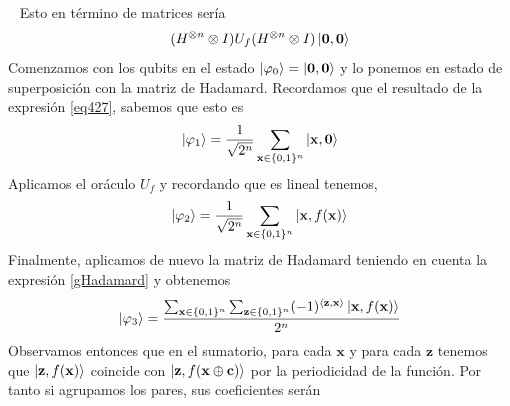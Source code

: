 \documentclass[a4paper]{article}
\numberwithin{equation}{section}
\begin{document}
\begin{figure}[h]
\centering
{}
\end{figure}\ \linebreak
Esto en término de matrices sería
\begin{equation}
(H^{\otimes n}\otimes I) U_f (H^{\otimes n}\otimes I)\ket{\mathbf{0}, \mathbf{0}}
\end{equation}
Comenzamos con los qubits en el estado $\ket{\varphi_0} = \ket{\mathbf{0}, \mathbf{0}}$ y lo ponemos en estado de superposición con la matriz de Hadamard. Recordamos que el resultado de la expresión \ref{eq427}, sabemos que esto es
\begin{equation}
\ket{\varphi_1} =
\frac{1}{\sqrt{2^n}} \sum_{\mathbf{x}\in\{0,1\}^n} \ket{\mathbf{x}, \mathbf{0}}
\end{equation}
Aplicamos el oráculo $U_f$ y recordando que es lineal tenemos,
\begin{equation}
\ket{\varphi_2} =
\frac{1}{\sqrt{2^n}} \sum_{\mathbf{x}\in\{0,1\}^n} \ket{\mathbf{x}, f(\mathbf{x})}
\end{equation}
Finalmente, aplicamos de nuevo la matriz de Hadamard teniendo en cuenta la expresión \ref{gHadamard} y obtenemos
\begin{equation}
\ket{\varphi_3} =
\frac{ \sum_{\mathbf{x}\in\{0,1\}^n} \sum_{\mathbf{z}\in\{0,1\}^n} (-1)^{\langle \mathbf{z}, \mathbf{x} \rangle} \ket{\mathbf{x}, f(\mathbf{x})} } {2^n}
\end{equation}
Observamos entonces que en el sumatorio, para cada $\mathbf{x}$ y para cada $\mathbf{z}$ tenemos que $\ket{\mathbf{z}, f(\mathbf{x})}$ coincide con $\ket{\mathbf{z}, f(\mathbf{x}\oplus\mathbf{c})}$ por la periodicidad de la función. Por tanto si agrupamos los pares, sus coeficientes serán
\end{document}
